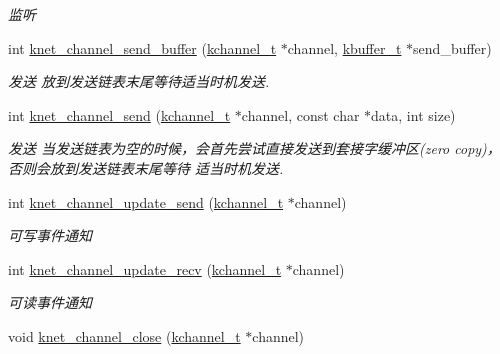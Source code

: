 \begin{DoxyCompactItemize}
\begin{DoxyCompactList}\small\item\em 监听 \end{DoxyCompactList}\item 
int \hyperlink{a00061_aeef6af4f8e4d97905640ade15dc13c33_aeef6af4f8e4d97905640ade15dc13c33}{knet\+\_\+channel\+\_\+send\+\_\+buffer} (\hyperlink{a00066_aca9cd34897582aa9969245a93cc62fb5_aca9cd34897582aa9969245a93cc62fb5}{kchannel\+\_\+t} $\ast$channel, \hyperlink{a00066_a4b09a7574cd440f9b94285ab73c81b4e_a4b09a7574cd440f9b94285ab73c81b4e}{kbuffer\+\_\+t} $\ast$send\+\_\+buffer)
\begin{DoxyCompactList}\small\item\em 发送 放到发送链表末尾等待适当时机发送. \end{DoxyCompactList}\item 
int \hyperlink{a00061_ad7d429bb2a30ded75493a9ccf22bad63_ad7d429bb2a30ded75493a9ccf22bad63}{knet\+\_\+channel\+\_\+send} (\hyperlink{a00066_aca9cd34897582aa9969245a93cc62fb5_aca9cd34897582aa9969245a93cc62fb5}{kchannel\+\_\+t} $\ast$channel, const char $\ast$data, int size)
\begin{DoxyCompactList}\small\item\em 发送 当发送链表为空的时候，会首先尝试直接发送到套接字缓冲区(zero copy)，否则会放到发送链表末尾等待 适当时机发送. \end{DoxyCompactList}\item 
int \hyperlink{a00061_a6b94f1431ad03b1bc7497d5680f2c8fe_a6b94f1431ad03b1bc7497d5680f2c8fe}{knet\+\_\+channel\+\_\+update\+\_\+send} (\hyperlink{a00066_aca9cd34897582aa9969245a93cc62fb5_aca9cd34897582aa9969245a93cc62fb5}{kchannel\+\_\+t} $\ast$channel)
\begin{DoxyCompactList}\small\item\em 可写事件通知 \end{DoxyCompactList}\item 
int \hyperlink{a00061_a0e79d45ab68ec6cc5c85425231f3e9a1_a0e79d45ab68ec6cc5c85425231f3e9a1}{knet\+\_\+channel\+\_\+update\+\_\+recv} (\hyperlink{a00066_aca9cd34897582aa9969245a93cc62fb5_aca9cd34897582aa9969245a93cc62fb5}{kchannel\+\_\+t} $\ast$channel)
\begin{DoxyCompactList}\small\item\em 可读事件通知 \end{DoxyCompactList}\item 
void \hyperlink{a00061_ad9ce907288d44a762a93ff54c4a4a7af_ad9ce907288d44a762a93ff54c4a4a7af}{knet\+\_\+channel\+\_\+close} (\hyperlink{a00066_aca9cd34897582aa9969245a93cc62fb5_aca9cd34897582aa9969245a93cc62fb5}{kchannel\+\_\+t} $\ast$channel)

\end{DoxyCompactItemize}
